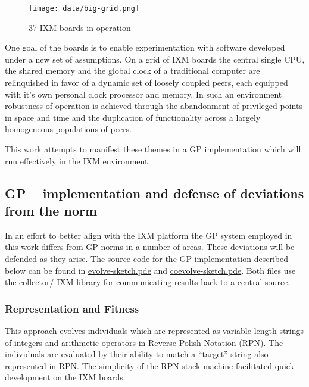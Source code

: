 \documentclass[11pt]{article}
\begin{document}
\begin{figure}[htb]
\centering
\texttt{[image: data/big-grid.png]}
\caption{37 IXM boards in operation}
\end{figure}

One goal of the boards is to enable experimentation with software
developed under a new set of assumptions.  On a grid of IXM boards the
central single CPU, the shared memory and the global clock of a
traditional computer are relinquished in favor of a dynamic set of
loosely coupled peers, each equipped with it's own personal clock
processor and memory.  In such an environment robustness of operation
is achieved through the abandonment of privileged points in space and
time and the duplication of functionality across a largely homogeneous
populations of peers.

This work attempts to manifest these themes in a GP implementation
which will run effectively in the IXM environment.

\subsection*{GP -- implementation and defense of deviations from the norm}
\label{sec-1.3}

In an effort to better align with the IXM platform the GP system
employed in this work differs from GP norms in a number of areas.
These deviations will be defended as they arise.  The source code for
the GP implementation described below can be found in
\href{file:///nfs/adaptive/eschulte/src/gp4ixm-report/src/evolve-sketch.pde}{evolve-sketch.pde} and \href{file:///nfs/adaptive/eschulte/src/gp4ixm-report/src/coevolve-sketch.pde}{coevolve-sketch.pde}.  Both files use the
\href{file:///nfs/adaptive/eschulte/src/gp4ixm-report/src/collector/}{collector/} IXM library for communicating results back to a central
source.

\subsubsection*{Representation and Fitness}
\label{sec-1.3.1}

This approach evolves individuals which are represented as variable
length strings of integers and arithmetic operators in Reverse Polish
Notation (RPN).  The individuals are evaluated by their ability to
match a ``target'' string also represented in RPN.  The simplicity of
the RPN stack machine facilitated quick development on the IXM boards.
\end{document}
